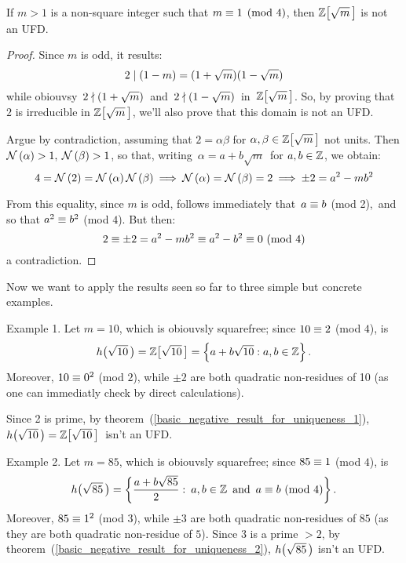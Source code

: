 \begin{thm}\label{basic_negative_result_for_uniqueness_3}
If $m > 1$ is a non-square integer such that $m \equiv 1 \pmod 4$,
then $\ZZ{m}$ is not an UFD.
\end{thm}

\begin{proof}
%
Since $m$ is odd, it results:
$$
2 \mid (1 - m) = (1 + \sqrt{m})(1 - \sqrt{m})
$$
while obiouvsy\, $2 \nmid (1 + \sqrt{m})$\,
and\, $2 \nmid (1 - \sqrt{m})$\, in\, $\ZZ{m}$.
So, by proving that $2$ is irreducible in $\ZZ{m}$,
we'll also prove that this domain is not an UFD.

Argue by contradiction, assuming that $2 = \alpha \beta$
for $\alpha, \beta \in \ZZ{m}$ not units.
Then\, $\mathcal{N}\left(\alpha\right) > 1,\: \mathcal{N}\left(\beta\right) > 1$, so that,
writing\, $\alpha = a + b\sqrt{m}$\, for $a, b \in \mathbb{Z}$,
we obtain:
$$
4 = \mathcal{N}\left(2\right) = \mathcal{N}\left(\alpha\right)\mathcal{N}\left(\beta\right) \:\Longrightarrow\:
\mathcal{N}\left(\alpha\right) = \mathcal{N}\left(\beta\right) = 2 \:\Longrightarrow\: \pm{2} =
a^2 - mb^2
$$

From this equality, since $m$ is odd, follows immediately
that\, $a \equiv b$ (mod 2),\, and so that
$a^2 \equiv b^2$ (mod $4$). But then:
$$
2 \equiv \pm{2} = a^2 - mb^2 \equiv a^2 - b^2
\equiv 0\ (\mathrm{mod}\ 4)
$$
a contradiction.
%
\end{proof}

\bigskip
Now we want to apply the results seen so far to three simple
but concrete examples.

\medskip
\textsf{Example 1.}  Let $m = 10$, which is obiouvsly
squarefree; since $10 \equiv 2$ (mod $4$), is\,
$$
\hh{10} = \ZZ{10} =
\left\{a + b\sqrt{10} : a,b \in \Z\right\}.
$$
Moreover, $10 \equiv 0^2$ (mod $2$),
while $\pm{2}$ are both quadratic non-residues of 10
(as one can immediatly check by direct calculations).

Since 2 is prime, by
theorem~(\ref{basic_negative_result_for_uniqueness_1}),\,
$\hh{10} = \ZZ{10}$\, isn't an UFD.

\medskip
\textsf{Example 2.}  Let $m = 85$, which is obiouvsly
squarefree; since $85 \equiv 1$ (mod $4$), is\,
$$
\hh{85} = \left\{\frac{a + b\sqrt{85}}{2}:\:
a,b \in \Z\ \,\textrm{and}\,\ a \congruent
b\ \textrm{(mod\ 4)}\right\}.
$$
Moreover, $85 \equiv 1^2$ (mod $3$),
while $\pm{3}$ are both quadratic non-residues of
$85$ (as they are both quadratic non-residue of
$5$). Since $3$ is a prime $> 2$, by
theorem~(\ref{basic_negative_result_for_uniqueness_2}),
$\hh{85}$ isn't an UFD.
 
